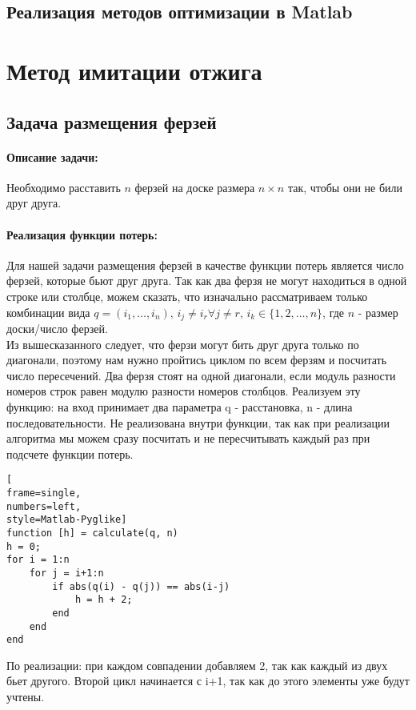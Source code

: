 \documentclass[12pt]{article}
\begin{document}
\begin{center}
    \section*{Реализация методов оптимизации в Matlab}
\end{center}
\section{Метод имитации отжига}
\subsection{Задача размещения ферзей}
\paragraph{Описание задачи:} Необходимо расставить $n$ ферзей на доске размера $n \times n$ так, чтобы они не били друг друга. 
\paragraph{Реализация функции потерь:}
Для нашей задачи размещения ферзей в качестве функции потерь является число ферзей, которые бьют друг друга. Так как два ферзя не могут находиться в одной строке или столбце, можем сказать, что изначально рассматриваем только комбинации вида $q = (i_1, \dots, i_n), \, i_j \neq i_r \forall j \neq r, \, i_k \in \{1, 2, \dots, n\}$, где $n$ - размер доски/число ферзей. \\
Из вышесказанного следует, что ферзи могут бить друг друга только по диагонали, поэтому нам нужно пройтись циклом по всем ферзям и посчитать число пересечений. Два ферзя стоят на одной диагонали, если модуль разности номеров строк равен модулю разности номеров столбцов. Реализуем эту функцию: на вход принимает два параметра q - расстановка, n - длина последовательности. Не реализована внутри функции, так как при реализации алгоритма мы можем сразу посчитать и не пересчитывать каждый раз при подсчете функции потерь. 
\begin{lstlisting}[
frame=single,
numbers=left,
style=Matlab-Pyglike]
function [h] = calculate(q, n)
h = 0;
for i = 1:n
    for j = i+1:n
        if abs(q(i) - q(j)) == abs(i-j)
            h = h + 2;
        end
    end
end
\end{lstlisting}
По реализации: при каждом совпадении добавляем 2, так как каждый из двух бьет другого. Второй цикл начинается с i+1, так как до этого элементы уже будут учтены. 
\end{document}
